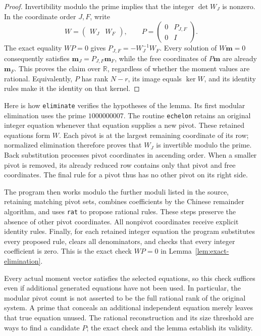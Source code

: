 \begin{proof}
Invertibility modulo the prime implies that the integer
$\det W_J$ is nonzero.  In the coordinate order $J,F$, write
\[
 W=\begin{pmatrix}W_J&W_F\end{pmatrix},\qquad
 P=\begin{pmatrix}0&P_{J,F}\\0&I\end{pmatrix}.
\]
The exact equality $WP=0$ gives
$P_{J,F}=-W_J^{-1}W_F$.  Every solution of $W\mathbf m=0$ consequently
satisfies $\mathbf m_J=P_{J,F}\mathbf m_F$, while the free coordinates
of $P\mathbf m$ are already $\mathbf m_F$.  This proves the claim over
$\mathbb R$, regardless of whether the moment values are rational.
Equivalently, $P$ has rank $N-r$, its image equals $\ker W$, and its
identity rules make it the identity on that kernel.
\end{proof}

Here is how \texttt{eliminate} verifies the hypotheses of the lemma.
Its first modular elimination uses the prime $1000000007$.  The routine
\texttt{echelon} retains an original integer equation whenever that
equation supplies a new pivot.  These retained equations form $W$.
Each pivot is at the largest remaining coordinate of its row; normalized
elimination therefore proves that $W_J$ is invertible modulo the prime.
Back substitution processes pivot coordinates in ascending order.
When a smaller pivot is removed, its already reduced row contains only
that pivot and free coordinates.  The final rule for a pivot thus has
no other pivot on its right side.

The program then works modulo the further moduli listed in the source,
retaining matching pivot sets, combines coefficients by the Chinese
remainder algorithm, and uses \texttt{rat} to propose rational rules.
These steps preserve the absence of other pivot coordinates.  All
nonpivot coordinates receive explicit identity rules.  Finally, for
each retained integer equation the program substitutes every proposed
rule, clears all denominators, and checks that every integer
coefficient is zero.  This is the exact check $WP=0$ in
Lemma~\ref{lem:exact-elimination}.

Every actual moment vector satisfies the selected equations, so this
check suffices even if additional generated equations have not been
used.  In particular, the modular pivot count is not asserted to be the
full rational rank of the original system.  A prime that conceals an
additional independent equation merely leaves that true equation
unused.  The rational reconstruction and its size threshold are ways
to find a candidate $P$; the exact check and the lemma establish its
validity.


